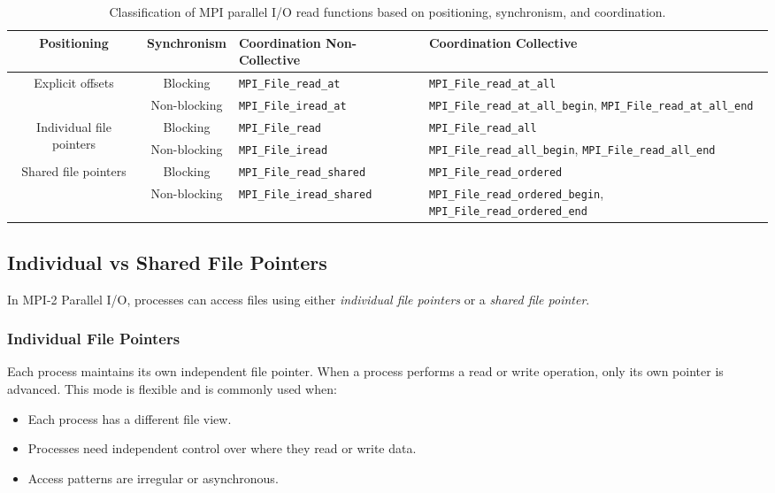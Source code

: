 \documentclass[12pt]{book}
\begin{document}
\begin{table}
    \centering
    \renewcommand{\arraystretch}{2.0}
    \begin{tabularx}{\textwidth}{|c|c|X|X|}
        \hline
        \textbf{Positioning} & \textbf{Synchronism} & \textbf{Coordination Non-Collective} & \textbf{Coordination Collective} \\
        \hline
        \multirow{2}{*}{Explicit offsets} 
            & Blocking 
            & \texttt{MPI\_File\_read\_at} 
            & \texttt{MPI\_File\_read\_at\_all} \\
        \cline{2-4}
            & Non-blocking 
            & \texttt{MPI\_File\_iread\_at} 
            & \texttt{MPI\_File\_read\_at\_all\_begin}, \texttt{MPI\_File\_read\_at\_all\_end} \\
        \hline
        \multirow{2}{*}{Individual file pointers} 
            & Blocking 
            & \texttt{MPI\_File\_read} 
            & \texttt{MPI\_File\_read\_all} \\
        \cline{2-4}
            & Non-blocking 
            & \texttt{MPI\_File\_iread} 
            & \texttt{MPI\_File\_read\_all\_begin}, \texttt{MPI\_File\_read\_all\_end} \\
        \hline
        \multirow{2}{*}{Shared file pointers} 
            & Blocking 
            & \texttt{MPI\_File\_read\_shared} 
            & \texttt{MPI\_File\_read\_ordered} \\
        \cline{2-4}
            & Non-blocking 
            & \texttt{MPI\_File\_iread\_shared} 
            & \texttt{MPI\_File\_read\_ordered\_begin}, \texttt{MPI\_File\_read\_ordered\_end} \\
        \hline
    \end{tabularx}
    \caption{Classification of MPI parallel I/O read functions based on positioning, synchronism, and coordination.}
    \label{tab:mpi_io_read}
\end{table}

\subsection{Individual vs Shared File Pointers}
In MPI-2 Parallel I/O, processes can access files using either \emph{individual file pointers} or a \emph{shared file pointer}.

\subsubsection*{Individual File Pointers}
Each process maintains its own independent file pointer. When a process performs a read or write operation, only its own pointer is advanced. This mode is flexible and is commonly used when:
\begin{itemize}
    \item Each process has a different file view.
    \item Processes need independent control over where they read or write data.
    \item Access patterns are irregular or asynchronous.
\end{itemize}
\end{document}
